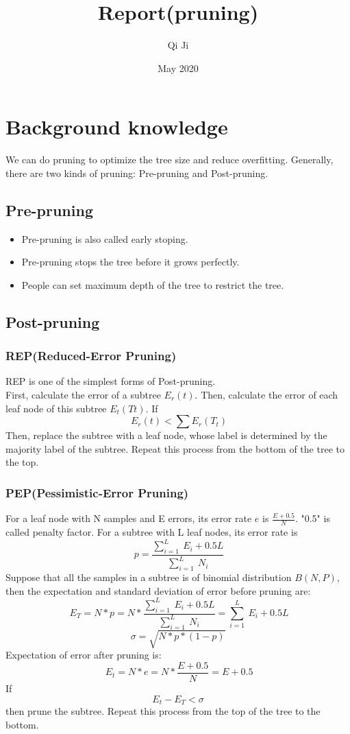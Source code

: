 \documentclass{article}
\title{Report(pruning)}
\author{Qi Ji}
\date{May 2020}
\begin{document}
\maketitle

\section{Background knowledge}
We can do pruning to optimize the tree size and reduce overfitting. Generally, there are two kinds of pruning: Pre-pruning and Post-pruning. 
\subsection{Pre-pruning}
\begin{itemize}
    \item Pre-pruning is also called early stoping.
    \item Pre-pruning stops the tree before it grows perfectly.
    \item People can set maximum depth of the tree to restrict the tree.
\end{itemize}

\subsection{Post-pruning}
\subsubsection{REP(Reduced-Error Pruning)}
REP is one of the simplest forms of Post-pruning.\\
First, calculate the error of a subtree $E_{r}(t)$.
Then, calculate the error of each leaf node of this subtree $E_{t}(Tt)$.
If $$\ E_{r}(t) < \sum E_{r}(T_{t})$$
Then, replace the subtree with a leaf node, whose label is determined by the majority label of the subtree. Repeat this process from the bottom of the tree to the top.
\subsubsection{PEP(Pessimistic-Error Pruning)}
For a leaf node with N samples and E errors, its error rate $e$ is $\frac{E+0.5}{N}$. "0.5" is called penalty factor. For a subtree with L leaf nodes, its error rate is 
$$ \ p = \frac{\sum_{i=1}^{L}\ E_{i}+0.5L}{\sum_{i=1}^{L}\ N_{i}}$$
Suppose that all the samples in a subtree is of binomial distribution $B(N,P)$, then the expectation and standard deviation of error before pruning are:
$$\ E_{T} = N*p = N*\frac{\sum_{i=1}^{L}\ E_{i}+0.5L}{\sum_{i=1}^{L}\ N_{i}} = \sum_{i=1}^{L}\ E_{i}+0.5L $$
$$\sigma = \sqrt{N*p*(1-p)}$$
Expectation of error after pruning is:
$$\ E_{t} = N*e = N*\frac{E+0.5}{N} = E+0.5$$
If $$E_{t} - E_{T} < \sigma$$
then prune the subtree. Repeat this process from the top of the tree to the bottom.
\end{document}
